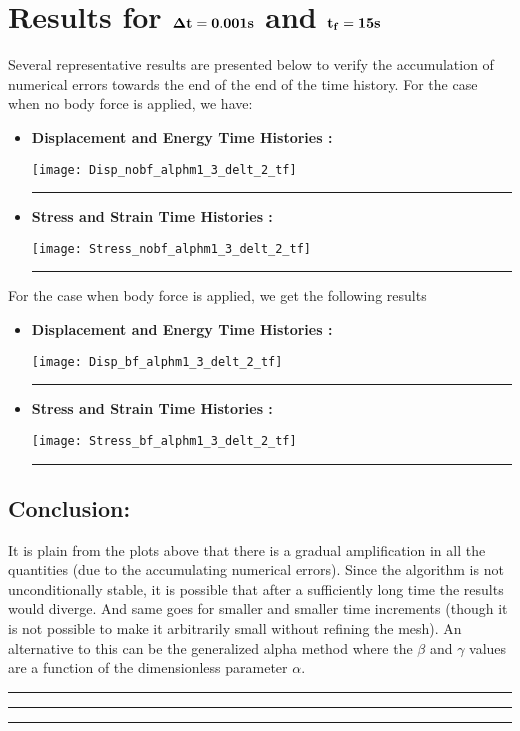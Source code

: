 \section*{Results for $\bf\Delta t = 0.001s$ and $\bf t_f = 15s$}
Several representative results are presented below to verify the accumulation of numerical errors towards the end of the end of the time history. For the case when no body force is applied, we have: 
\begin{itemize}
\item { \bf Displacement and Energy Time Histories :}
\begin{center}
\texttt{[image: Disp\_nobf\_alphm1\_3\_delt\_2\_tf]}
\end{center}\hrule
\newpage
\item { \bf Stress and Strain Time Histories :}
\begin{center}
\texttt{[image: Stress\_nobf\_alphm1\_3\_delt\_2\_tf]}
\end{center}\hrule
\end{itemize}
\newpage
For the case when body force is applied, we get the following results
\begin{itemize}
\item { \bf Displacement and Energy Time Histories :}
\begin{center}
\texttt{[image: Disp\_bf\_alphm1\_3\_delt\_2\_tf]}
\end{center}\hrule
\newpage
\item { \bf Stress and Strain Time Histories :}
\begin{center}
\texttt{[image: Stress\_bf\_alphm1\_3\_delt\_2\_tf]}
\end{center}\hrule
\end{itemize}
\subsection*{Conclusion: }
It is plain from the plots above that there is a gradual amplification in all the quantities (due to the accumulating numerical errors). Since the algorithm is not unconditionally stable, it is possible that after a sufficiently long time the results would diverge. And same goes for smaller and smaller time increments (though it is not possible to make it arbitrarily small without refining the mesh). An alternative to this can be the generalized alpha method where the $\beta$ and $\gamma$ values are a function of the dimensionless parameter $\alpha$.\\ \hrule \hrule \hrule 
